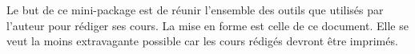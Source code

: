 Le but de ce mini-package est de réunir l'ensemble des outils que utilisés par l'auteur pour rédiger ses cours. La mise en forme est celle de ce document. Elle se veut la moins extravagante possible car les cours rédigés devront être imprimés.